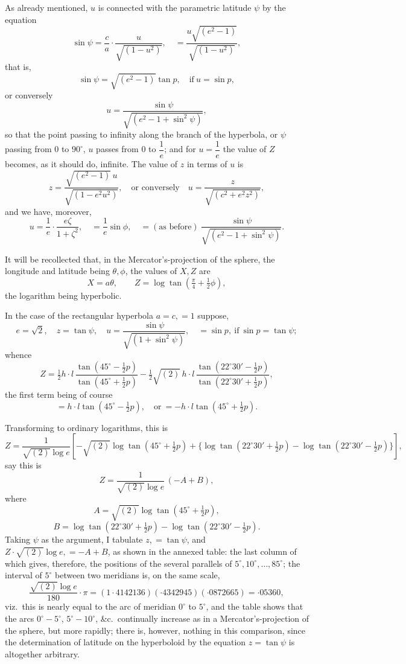 \documentclass[11pt]{article}
\begin{document}
\medskip
As already mentioned, $u$ is connected with the parametric latitude $\psi$ by the
equation
\[
\sin\psi=\frac{c}{a}\cdot\frac{u}{\sqrt{(1-u^{2})}},\quad=\frac{u\sqrt{(e^{2}-1)}}{\sqrt{(1-u^{2})}},
\]
that is,
\[
\sin\psi=\sqrt{(e^{2}-1)}\tan p,\quad\text{if}\ u=\sin p,
\]
or conversely
\[
u=\frac{\sin\psi}{\sqrt{(e^{2}-1+\sin^{2}\psi)}},
\]
so that the point passing to infinity along the branch of the hyperbola, or $\psi$
passing from $0$ to $90^{\circ}$, $u$ passes from $0$ to $\dfrac{1}{e}$; and for
$u=\dfrac{1}{e}$ the value of $Z$ becomes, as it should do, infinite. The value of $z$ in
terms of $u$ is
\[
z=\frac{\sqrt{(e^{2}-1)}\,u}{\sqrt{(1-e^{2}u^{2})}},\quad\text{or conversely}\quad
u=\frac{z}{\sqrt{(c^{2}+e^{2}z^{2})}},
\]
and we have, moreover,
\[
u=\frac{1}{e}\cdot\frac{e\zeta}{1+\zeta^{2}},\quad=\frac{1}{e}\sin\phi,\quad=(\text{as before})\ \frac{\sin\psi}{\sqrt{(e^{2}-1+\sin^{2}\psi)}}.
\]

It will be recollected that, in the Mercator's-projection of the sphere, the longitude
and latitude being $\theta,\phi$, the values of $X,Z$ are
\[
X=a\theta,\qquad Z=\log\tan\!\left(\tfrac{\pi}{4}+\tfrac{1}{2}\phi\right),
\]
the logarithm being hyperbolic.

\medskip
In the case of the rectangular hyperbola $a=c,=1$ suppose,
\[
e=\sqrt{2},\quad z=\tan\psi,\quad u=\frac{\sin\psi}{\sqrt{(1+\sin^{2}\psi)}},\quad=\sin p,\ \text{if}\ \sin p=\tan\psi;
\]
whence
\[
Z=\tfrac{1}{2}h\cdot l\,\frac{\tan(45^{\circ}-\tfrac{1}{2}p)}{\tan(45^{\circ}+\tfrac{1}{2}p)}-\tfrac{1}{2}\sqrt{(2)}\,h\cdot l\,\frac{\tan(22^{\circ}30'-\tfrac{1}{2}p)}{\tan(22^{\circ}30'+\tfrac{1}{2}p)},
\]
the first term being of course
\[
=h\cdot l\tan(45^{\circ}-\tfrac{1}{2}p),\quad\text{or}\ =-h\cdot l\tan(45^{\circ}+\tfrac{1}{2}p).
\]

Transforming to ordinary logarithms, this is
\[
Z=\frac{1}{\sqrt{(2)}\log e}\!\left[-\sqrt{(2)}\log\tan(45^{\circ}+\tfrac{1}{2}p)+\{\log\tan(22^{\circ}30'+\tfrac{1}{2}p)-\log\tan(22^{\circ}30'-\tfrac{1}{2}p)\}\right],
\]
say this is
\[
Z=\frac{1}{\sqrt{(2)}\log e}\,(-A+B),
\]
where
\[
A=\sqrt{(2)}\log\tan(45^{\circ}+\tfrac{1}{2}p),
\]
\[
B=\log\tan(22^{\circ}30'+\tfrac{1}{2}p)-\log\tan(22^{\circ}30'-\tfrac{1}{2}p).
\]
Taking $\psi$ as the argument, I tabulate $z,=\tan\psi$, and
$Z\cdot\sqrt{(2)}\log e,=-A+B$, as shown in the annexed table: the last column of which
gives, therefore, the positions of the several parallels of
$5^{\circ},10^{\circ},\ldots,85^{\circ}$; the interval of $5^{\circ}$ between two meridians
is, on the same scale,
\[
\frac{\sqrt{(2)}\log e}{180}\cdot\pi=(1{\cdot}4142136)(\cdot 4342945)(\cdot 0872665)=\cdot 05360,
\]
viz.\ this is nearly equal to the arc of meridian $0^{\circ}$ to $5^{\circ}$, and the
table shows that the arcs $0^{\circ}-5^{\circ}$, $5^{\circ}-10^{\circ}$, \&c.\ continually
increase as in a Mercator's-projection of the sphere, but more rapidly; there is,
however, nothing in this comparison, since the determination of latitude on the
hyperboloid by the equation $z=\tan\psi$ is altogether arbitrary.
\end{document}
